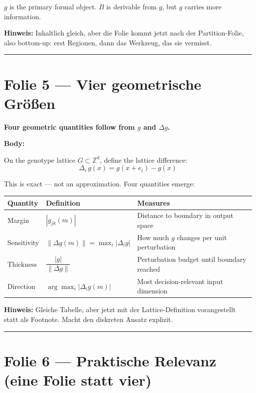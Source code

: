 \documentclass[11pt, a4paper]{article}
\newcommand{\actiontitle}[1]{{\Large\bfseries\color{tumdark} #1}\par\vspace{0.3em}}
\newcommand{\slidenote}[1]{{\small\color{accent}\textbf{Hinweis:} #1}\par}
\begin{document}
$g$ is the primary formal object. $B$ is derivable from $g$, but $g$ carries more information.

\slidenote{Inhaltlich gleich, aber die Folie kommt jetzt nach der Partition-Folie, also bottom-up: erst Regionen, dann das Werkzeug, das sie vermisst.}

\bigskip\hrule\bigskip

\section*{Folie 5 --- Vier geometrische Gr\"o\ss en}

\actiontitle{Four geometric quantities follow from $g$ and $\Delta g$.}

\textbf{Body:}

On the genotype lattice $G \subset \mathbb{Z}^d$, define the lattice difference:
%
\begin{equation}
\Delta_i\, g(x) = g(x + e_i) - g(x)
\end{equation}

This is exact --- not an approximation. Four quantities emerge:

\begin{center}
\renewcommand{\arraystretch}{1.4}
\begin{tabular}{llp{5.5cm}}
\textbf{Quantity} & \textbf{Definition} & \textbf{Measures} \\
\hline
Margin & $|g_{jk}(m)|$ & Distance to boundary in output space \\
Sensitivity & $\|\Delta g(m)\| = \max_i |\Delta_i g|$ & How much $g$ changes per unit perturbation \\
Thickness & $\dfrac{|g|}{\|\Delta g\|}$ & Perturbation budget until boundary reached \\
Direction & $\arg\max_i |\Delta_i g(m)|$ & Most decision-relevant input dimension \\
\end{tabular}
\end{center}

\slidenote{Gleiche Tabelle, aber jetzt mit der Lattice-Definition vorangestellt statt als Footnote. Macht den diskreten Ansatz explizit.}

\bigskip\hrule\bigskip

\section*{Folie 6 --- Praktische Relevanz (eine Folie statt vier)}
\end{document}

